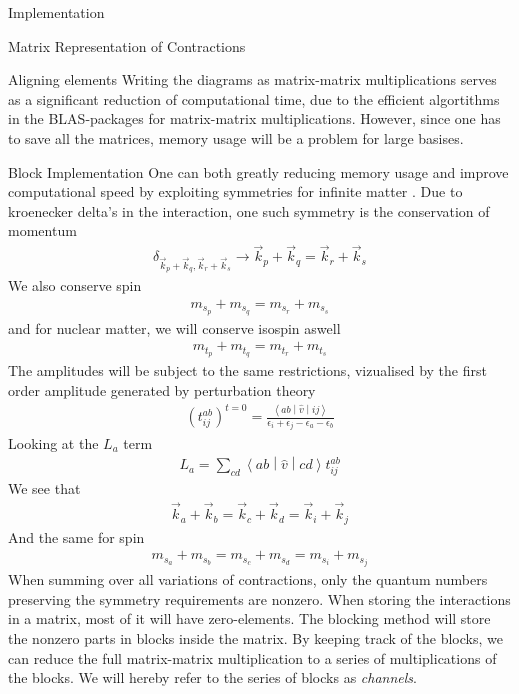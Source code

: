 \documentclass[twoside,english]{uiofysmaster}
\begin{document}
\begin{chapter}{Implementation}
\begin{section}{Matrix Representation of Contractions}
\begin{subsection}{Aligning elements}
			Writing the diagrams as matrix-matrix multiplications serves as a significant reduction of computational time, due to the efficient algortithms in the BLAS-packages for matrix-matrix multiplications. However, since one has to save all the matrices, memory usage will be a problem for large basises. 
		\end{subsection}

	\end{section}

	\begin{section}{Block Implementation}
		One can both greatly reducing memory usage and improve computational speed by exploiting symmetries for infinite matter . Due to kroenecker delta's in the interaction, one such symmetry is the conservation of momentum
		\begin{align}
			\delta_{\vec k_p + \vec k_q, \vec k_r + \vec k_s} \rightarrow \vec k_p + \vec k_q = \vec k_r + \vec k_s
		\end{align}
		We also conserve spin 
		\begin{align}
			m_{s_p} + m_{s_q} = m_{s_r} + m_{s_s}
		\end{align}
		and for nuclear matter, we will conserve isospin aswell
		\begin{align}
			m_{t_p} + m_{t_q} = m_{t_r} + m_{t_s}
		\end{align}
		The amplitudes will be subject to the same restrictions, vizualised by the first order amplitude generated by perturbation theory
		\begin{align}
			(t_{ij}^{ab})^{t=0} = \frac{\left<ab\middle|\hat v\middle|ij\right>}{\epsilon_i + \epsilon_j - \epsilon_a - \epsilon_b}
		\end{align}
		Looking at the $L_a$ term
		\begin{align}
			L_a = \sum_{cd} \left<ab\middle|\hat v\middle|cd\right> t_{ij}^{ab}
		\end{align}
		We see that 
		\begin{align}
			\vec k_a + \vec k_b = \vec k_c + \vec k_d = \vec k_i + \vec k_j
		\end{align}
		And the same for spin
		\begin{align}
			m_{s_a} + m_{s_b} = m_{s_c} + m_{s_d} = m_{s_i} + m_{s_j} 
		\end{align}
		When summing over all variations of contractions, only the quantum numbers preserving the symmetry requirements are nonzero. When storing the interactions in a matrix, most of it will have zero-elements. The blocking method will store the nonzero parts in blocks inside the matrix. By keeping track of the blocks, we can reduce the full matrix-matrix multiplication to a series of multiplications of the blocks. We will hereby refer to the series of blocks as \textit{channels}.


\end{section}
\end{chapter}
\end{document}
